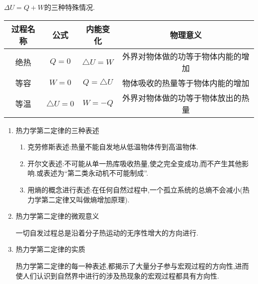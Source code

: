 $\Delta U = Q + W$的三种特殊情况.
\begin{table}[h!]
\centering 
\begin{tabular}{|c|c|c|c|}
\hline 
过程名称 & 公式 & 内能变化 & 物理意义
\\
\hline
绝热 &$ Q=0 $ &$ \triangle U=W $ & 外界对物体做的功等于物体内能的增加
\\
\hline
等容 &$ W=0 $ &$ Q= \triangle U $ & 物体吸收的热量等于物体内能的增加
\\
\hline
等温 & $ \triangle U=0 $&$ W=-Q $& 外界对物体做的功等于物体放出的热量
\\
\hline
\end{tabular}
\end{table} 

\begin{enumerate}
\renewcommand{\labelenumi}{\arabic{enumi}.}
\item
热力学第二定律的三种表述
\begin{enumerate}
\renewcommand{\labelenumi}{\arabic{enumi}.}
\item
克劳修斯表述:热量不能自发地从低温物体传到高温物体.
\item 
开尔文表述:不可能从单一热库吸收热量,使之完全变成功,而不产生其他影响.或表述为“第二类永动机不可能制成”.
\item 
用熵的概念进行表述:在任何自然过程中,一个孤立系统的总熵不会减小(热力学第二定律又叫做熵增加原理).




\end{enumerate}

\item 
热力学第二定律的微观意义

一切自发过程总是沿着分子热运动的无序性增大的方向进行.

\item 
热力学第二定律的实质

热力学第二定律的每一种表述,都揭示了大量分子参与宏观过程的方向性,进而使人们认识到自然界中进行的涉及热现象的宏观过程都具有方向性.


\end{enumerate}
